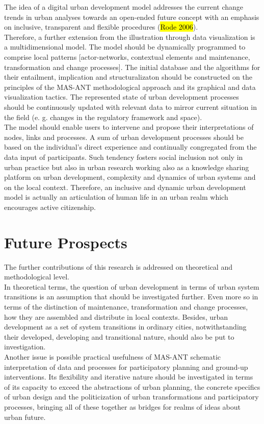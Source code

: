 \documentclass[11pt]{report}
\begin{document}
The idea of a digital urban development model addresses the current change trends in urban analyses towards an open-ended future concept with an emphasis on inclusive, transparent and flexible procedures (\hl{Rode 2006}).
\\
Therefore, a further extension from the illustration through data visualization is a multidimensional model.
The model should be dynamically programmed to comprise local patterns [actor-networks, contextual elements and maintenance, transformation and change processes].
The initial database and the algorithms for their entailment, implication and structuralizaton should be constructed on the principles of the MAS-ANT methodological approach and its graphical and data visualization tactics.
The represented state of urban development processes should be continuously updated with relevant data to mirror current situation in the field (e. g. changes in the regulatory framework and space).
\\
The model should enable users to intervene and propose their interpretations of nodes, links and processes.
A sum of urban development processes should be based on the individual's direct experience and continually congregated from the data input of participants.
Such tendency fosters social inclusion not only in urban practice but also in urban research working also as a knowledge sharing platform on urban development, complexity and dynamics of urban systems and on the local context.
Therefore, an inclusive and dynamic urban development model is actually an articulation of human life in an urban realm which encourages active citizenship.

\section{Future Prospects}

The further contributions of this research is addressed on theoretical and methodological level. 
\\
In theoretical terms, the question of urban development in terms of urban system transitions is an assumption that should be investigated further. Even more so in terms of the distinction of maintenance, transformation and change processes, how they are assembled and distribute in local contexts.
Besides, urban development as a set of system transitions in ordinary cities, notwithstanding their developed, developing and transitional nature, should also be put to investigation. 
\\
Another issue is possible practical usefulness of MAS-ANT schematic interpretation of data and processes for participatory planning and ground-up interventions.
Its flexibility and iterative nature should be investigated in terms of its capacity to exceed the abstractions of urban planning, the concrete specifics of urban design and the politicization of urban transformations and participatory processes, bringing all of these together as bridges for realms of ideas about urban future.
\end{document}
